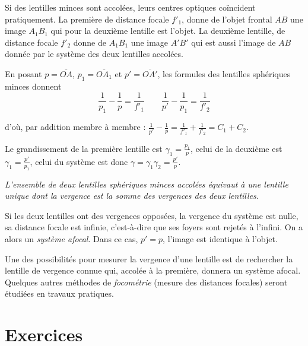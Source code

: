 Si des 	lentilles minces sont accolées, leurs centres optiques co\"incident 
pratiquement. La première de distance focale \(f'_1\), donne de l'objet frontal 
\(AB\) une image \(A_1B_1\) qui pour la deuxième lentille est l'objet. La 
deuxième lentille, de distance focale \(f'_2\) donne de \(A_1B_1\) une image 
\(A'B'\) qui est aussi l'image de \(AB\) donnée par le système des deux 
lentilles accolées.

En posant \(p = \overline{OA}\), \(p_1 = \overline{OA_1}\) et \(p' = 
\overline{OA'}\), les formules des lentilles sphériques minces donnent
\begin{equation}%
  \frac{1}{p_1} - \frac{1}{p} = \frac{1}{f'_1} \qquad \frac{1}{p'} - 
  \frac{1}{p_1} = \frac{1}{f'_2}
\end{equation}%

d'où, par addition membre à membre : \(\frac{1}{p'} - \frac{1}{p} = 
\frac{1}{f'_1} + \frac{1}{f'_2} = C_1 + C_2\).

Le grandissement de la première lentille est \(\gamma_1 = \frac{p_1}{p}\), 
celui de la deuxième est \(\gamma_1 = \frac{p'}{p_1}\), celui du système est 
donc \(\gamma = \gamma_1 \gamma_2 = \frac{p'}{p}\).

\emph{L'ensemble de deux lentilles sphériques minces accolées équivaut à une 
lentille unique dont la vergence est la somme des vergences des deux 
lentilles.}%

Si les deux lentilles ont des vergences opposées, la vergence du système est 
nulle, sa distance focale est infinie, c'est-à-dire que ses foyers sont rejetés 
à l'infini. On a alors un \emph{système afocal}. Dans ce cas, \(p' = p\), 
l'image est identique à l'objet.

Une des possibilités pour mesurer la vergence d'une lentille est de rechercher 
la lentille de vergence connue qui, accolée à la première, donnera un système 
afocal. Quelques autres méthodes de \emph{focométrie} (mesure des distances 
focales) seront étudiées en travaux pratiques.

\section{Exercices}%
\label{chap8-sec:exercices}%

